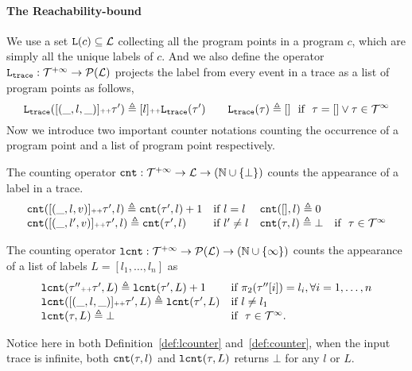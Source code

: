 \paragraph{The Reachability-bound}
We use a set $\mathtt{L}(c) \subseteq \mathcal{L}$ collecting all the program points in a program $c$, which are simply all the unique labels of $c$.
%
And we also define the operator $\mathtt{L}_{\mathtt{{trace}}} : \mathcal{T}^{+\infty} \to \mathcal{P}{(\mathcal{L})}$ projects the label from every event in a trace as a list of program points as follows,
{\small
\[
\mathtt{L}_{\mathtt{{trace}}}([(\_, l, \_)] {\scriptscriptstyle ++} \mathtt{\tau}') \triangleq [l] {\scriptscriptstyle ++} \mathtt{L}_{\mathtt{{trace}}}(\mathtt{\tau}')
\qquad
\mathtt{L}_{\mathtt{{trace}}}(\mathtt{\tau}) \triangleq []~~ \mbox{if}~~ \mathtt{\tau} = [] \lor \mathtt{\tau} \in \mathcal{T}^{\infty}
\]
}
Now we introduce two important counter notations counting the occurrence of a program point and a list of program point respectively.
\begin{defn}
  \label{def:counter}
The counting operator $\mathtt{cnt} : \mathcal{T}^{+\infty} \to \mathcal{L} \to (\mathbb{N} \cup \{\bot\})$
counts the appearance of a label in a trace.
{\small
\[
\begin{array}{llll}
\mathtt{cnt}([(\_, l, v)] {\scriptscriptstyle ++} \mathtt{\tau}', l ) \triangleq \mathtt{cnt}(\mathtt{\tau}', l) + 1 & \text{if}~ l = l
&
\mathtt{cnt}({[]}, l) \triangleq 0 & 
\\
\mathtt{cnt}([(\_, l', v)] {\scriptscriptstyle ++} \mathtt{\tau}', l) \triangleq \mathtt{cnt}(\mathtt{\tau}', l)   & \text{if}~ l' \neq l
&
\mathtt{cnt}(\mathtt{\tau}, l) \triangleq \bot & \text{if }~ \mathtt{\tau} \in \mathcal{T}^{\infty}
\end{array}
\]
}
\end{defn}
\begin{defn}
  \label{def:lcounter}
  The counting operator $\mathtt{lcnt} : \mathcal{T}^{+\infty} \to \mathcal{P}(\mathcal{L}) \to (\mathbb{N} \cup \{\infty\})$
  counts the appearance of a list of labels $L = [l_1, \ldots, l_n]$ as
{\small
  \[
    \begin{array}{ll}
    \mathtt{lcnt}(\mathtt{\tau}'' {\scriptscriptstyle ++} \mathtt{\tau}', L ) 
    \triangleq \mathtt{lcnt}(\mathtt{\tau}', L) + 1  & \text{if}~ \pi_2(\mathtt{\tau}''[i]) = l_i, \forall i = 1, \ldots, n
    \\ 
    \mathtt{lcnt}([(\_, l, \_)] {\scriptscriptstyle ++} \mathtt{\tau}', L ) 
    \triangleq \mathtt{lcnt}(\mathtt{\tau}', L) & \text{if}~ l \neq l_1
    \\ 
    \mathtt{lcnt}(\mathtt{\tau}, L ) 
    \triangleq \bot & \text{if }~ \mathtt{\tau} \in \mathcal{T}^{\infty}.
    \end{array}
  \]
}
\end{defn}
%
{Notice here in both Definition~\ref{def:lcounter} and~\ref{def:counter}, when the input trace is infinite, both $\mathtt{cnt}(\mathtt{\tau}, l)$ and  $\mathtt{lcnt}(\mathtt{\tau}, L)$ returns $\bot$ for any $l$ or $L$.}


